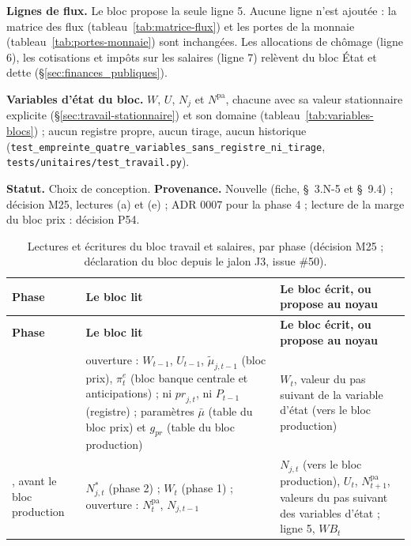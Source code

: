 \documentclass[11pt,a4paper]{article}
\begin{document}
\textbf{Lignes de flux.} Le bloc propose la seule ligne 5. Aucune ligne n'est ajoutée : la matrice des flux (tableau~\ref{tab:matrice-flux}) et les portes de la monnaie (tableau~\ref{tab:portes-monnaie}) sont inchangées. Les allocations de chômage (ligne 6), les cotisations et impôts sur les salaires (ligne 7) relèvent du bloc État et dette (\S\ref{sec:finances_publiques}).

{\setlength{\emergencystretch}{3em}\textbf{Variables d'état du bloc.} $W$, $U$, $N_{j}$ et $N^{\mathrm{pa}}$, chacune avec sa valeur stationnaire explicite (\S\ref{sec:travail-stationnaire}) et son domaine (tableau~\ref{tab:variables-blocs}) ; aucun registre propre, aucun tirage, aucun historique (\nolinkurl{test_empreinte_quatre_variables_sans_registre_ni_tirage}, \nolinkurl{tests/unitaires/test_travail.py}).\par}

\textbf{Statut.} Choix de conception. \textbf{Provenance.} Nouvelle (fiche, \S~3.N-5 et \S~9.4) ; décision M25, lectures (a) et (e) ; ADR 0007 pour la phase 4 ; lecture de la marge du bloc prix : décision P54.

\begin{center}\small
\begin{longtable}{>{\raggedright\arraybackslash}p{1.6cm}>{\raggedright\arraybackslash}p{6.9cm}>{\raggedright\arraybackslash}p{6.4cm}}
\caption{Lectures et écritures du bloc travail et salaires, par phase (décision M25 ; déclaration du bloc depuis le jalon J3, issue \#50).}\label{tab:travail-phases}\\
\toprule
\textbf{Phase} & \textbf{Le bloc lit} & \textbf{Le bloc écrit, ou propose au noyau}\\
\midrule
\endfirsthead
\toprule
\textbf{Phase} & \textbf{Le bloc lit} & \textbf{Le bloc écrit, ou propose au noyau}\\
\midrule
\endhead
1 & ouverture : $W_{t-1}$, $U_{t-1}$, $\tilde\mu_{j,t-1}$ (bloc prix), $\pi^e_t$ (bloc banque centrale et anticipations) ; ni $\mathit{pr}_{j,t}$, ni $P_{t-1}$ (registre) ; paramètres $\bar\mu$ (table du bloc prix) et $g_{\mathit{pr}}$ (table du bloc production) & $W_t$, valeur du pas suivant de la variable d'état (vers le bloc production)\\
4, avant le bloc production & $N^{\ast}_{j,t}$ (phase 2) ; $W_t$ (phase 1) ; ouverture : $N^{\mathrm{pa}}_t$, $N_{j,t-1}$ & $N_{j,t}$ (vers le bloc production), $U_t$, $N^{\mathrm{pa}}_{t+1}$, valeurs du pas suivant des variables d'état ; ligne 5, $\mathit{WB}_t$\\
\bottomrule
\end{longtable}
\end{center}
\end{document}
